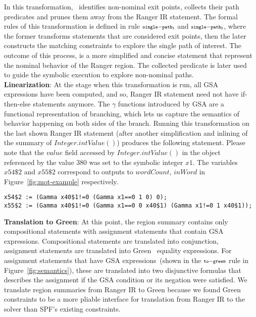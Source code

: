 In this transformation, \tool\ identifies non-nominal exit points, collects their path predicates and prunes them away
from the Ranger IR statement. The formal rules of this transformation is defined in rule $\scriptstyle\mathtt{single-path_1}$ and
$\scriptstyle\mathtt{single-path_2}$, where the former transforms statements that are considered exit points, then the later
constructs the matching constraints to explore the single path of interest.
%
The outcome of this process, is a more simplified and concise statement that represent the nominal behavior of the Ranger region.
%
The collected predicate is later used to guide the symbolic execution to explore non-nominal paths.\\
%
\textbf{Linearization}:
At the stage when this transformation is run, all GSA expressions have been computed, and so, Ranger IR statement
need not have if-then-else statements anymore.
%
The $\gamma$ functions introduced by GSA are a functional representation of branching, which lets us
capture the semantics of behavior happening on both sides of the branch.
%
Running this transformation on the last shown Ranger IR statement (after another simplification and inlining of the
summary of $Integer.intValue()$) produces the following statement.
%
Please note that the $value$ field accessed by $Integer.intValue()$ in the object referenced by the value
380 was set to the symbolic integer $x1$.
%
The variables $x54\$2$ and $x55\$2$ correspond to outputs to $wordCount$, $inWord$ in Figure~\ref{fig:mot-example} respectively.
\begin{lstlisting}[numbers=none]
x54$2 := (Gamma x40$1!=0 (Gamma x1==0 1 0) 0);
x55$2 := (Gamma x40$1!=0 (Gamma x1==0 0 x40$1) (Gamma x1!=0 1 x40$1));
\end{lstlisting}
\textbf{Translation to Green}:
%
At this point, the region summary contains only compositional statements with assignment statements that contain
GSA expressions.
%
Compositional statements are translated into conjunction, assignment statements are translated into Green~\cite{green}
equality expressions.
%
For assignment statements that have GSA expressions~(shown in the $\scriptstyle\mathtt{to-green}$ rule in Figure~\ref{fig:semantics}),
these are translated into two disjunctive formulas that describes the assignment if the GSA condition or its negation
were satisfied.
%
We translate region summaries from Ranger IR to Green because we found Green constraints to be a more pliable interface
for translation from Ranger IR to the solver than SPF\rq s existing constraints.

